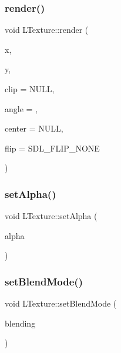 \subsubsection{\texorpdfstring{render()}{render()}}
{\footnotesize\ttfamily void L\+Texture\+::render (\begin{DoxyParamCaption}\item[{int}]{x,  }\item[{int}]{y,  }\item[{S\+D\+L\+\_\+\+Rect $\ast$}]{clip = {\ttfamily NULL},  }\item[{double}]{angle = {},  }\item[{S\+D\+L\+\_\+\+Point $\ast$}]{center = {\ttfamily NULL},  }\item[{S\+D\+L\+\_\+\+Renderer\+Flip}]{flip = {\ttfamily SDL\+\_\+FLIP\+\_\+NONE} }\end{DoxyParamCaption})}

\mbox{\label{class_l_texture_ab4e51b54752ae7b54614078f9128a9c0}} 
\subsubsection{\texorpdfstring{set\+Alpha()}{setAlpha()}}
{\footnotesize\ttfamily void L\+Texture\+::set\+Alpha (\begin{DoxyParamCaption}\item[{Uint8}]{alpha }\end{DoxyParamCaption})}

\mbox{\label{class_l_texture_aa1fe07070f715bf3981c129ae1619a4e}} 
\subsubsection{\texorpdfstring{set\+Blend\+Mode()}{setBlendMode()}}
{\footnotesize\ttfamily void L\+Texture\+::set\+Blend\+Mode (\begin{DoxyParamCaption}\item[{S\+D\+L\+\_\+\+Blend\+Mode}]{blending }\end{DoxyParamCaption})}

\mbox{\label{class_l_texture_a4ccf201515ecb158b137394d41ed9077}} 
